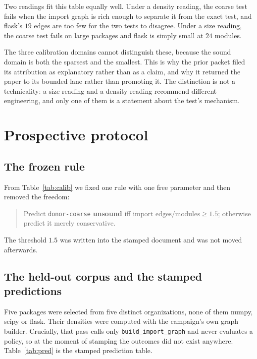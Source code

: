 \documentclass[11pt]{article}
\begin{document}
Two readings fit this table equally well. Under a density reading, the coarse test fails when the import graph is rich enough to separate it from the exact test, and flask's $19$ edges are too few for the two tests to disagree. Under a size reading, the coarse test fails on large packages and flask is simply small at $24$ modules.

The three calibration domains cannot distinguish these, because the sound domain is both the sparsest and the smallest. This is why the prior packet filed its attribution as explanatory rather than as a claim, and why it returned the paper to its bounded lane rather than promoting it. The distinction is not a technicality: a size reading and a density reading recommend different engineering, and only one of them is a statement about the test's mechanism.

\section{Prospective protocol}
\subsection{The frozen rule}
From Table~\ref{tab:calib} we fixed one rule with one free parameter and then removed the freedom:
\begin{quote}
Predict \texttt{donor-coarse} \textbf{unsound} iff $\text{import edges} / \text{modules} \ge 1.5$; otherwise predict it merely conservative.
\end{quote}
The threshold $1.5$ was written into the stamped document and was not moved afterwards.

\subsection{The held-out corpus and the stamped predictions}
Five packages were selected from five distinct organizations, none of them numpy, scipy or flask. Their densities were computed with the campaign's own graph builder. Crucially, that pass calls only \texttt{build_import_graph} and never evaluates a policy, so at the moment of stamping the outcomes did not exist anywhere. Table~\ref{tab:pred} is the stamped prediction table.
\end{document}
